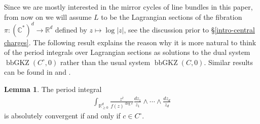 \documentclass[11pt,reqno]{amsart}
\def\CC {{\mathbb C}}
\def\R {{\mathbb R}}
\theoremstyle{definition}
\newtheorem{lemma}[theorem]{Lemma}
\numberwithin{equation}{section}
\begin{document}
\smallskip

Since we are mostly interested in the mirror cycles of line bundles in this paper, from now on we will assume $L$ to be the Lagrangian sections of the fibration $\pi:(\CC^*)^d\rightarrow \R^d$ defined by $z\mapsto\log|z|$, see the discussion prior to \S\ref{intro-central charges}. The following result explains the reason why it is more natural to think of the period integrals over Lagrangian sections as solutions to the dual system $\operatorname{bbGKZ}(C^{\circ},0)$ rather than the usual system $\operatorname{bbGKZ}(C,0)$. Similar results can be found in \cite{EulerMellinIntegral1} and \cite{EulerMellinIntegral2}. 

\smallskip

\begin{lemma}
	The period integral
	\begin{align*}
		\int_{\R_{\geq 0}^d}\frac{z^{\bar{c}}}{f(z)^{\deg c}}\frac{dz_1}{z_1}\wedge\cdots\wedge\frac{dz_d}{z_d}
	\end{align*}
	is absolutely convergent if and only if $c\in C^{\circ}$.
\end{lemma}
\end{document}
